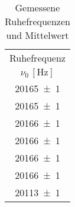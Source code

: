 \begin{table}[!h]
	\centering
	\begin{tabular}{|c|}
		\hline
		Ruhefrequenz\\
		$\nu_{0}\,[\si{\hertz}]$\\\hline\hline
		\num{20165(1)} \\
		\num{20165(1)} \\
		\num{20166(1)} \\
		\num{20166(1)} \\
		\num{20166(1)} \\
		\num{20166(1)} \\
		\num{20113(1)} \\
		\hline
	\end{tabular}
	\caption{Gemessene Ruhefrequenzen und Mittelwert \label{tab:Auswertung_Ruhefrequenz}}
\end{table}